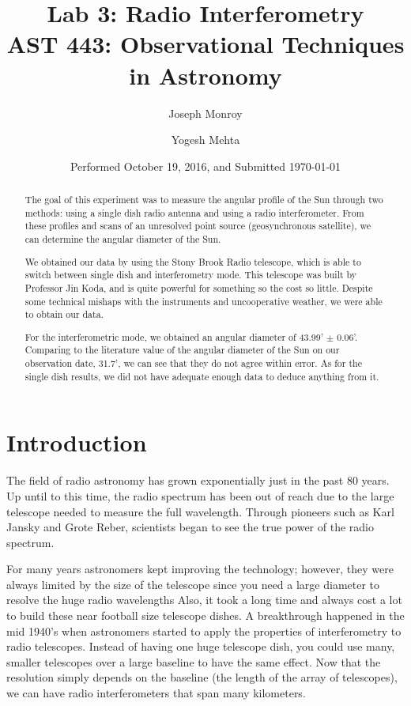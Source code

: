 \documentclass{aastex61}
\begin{document}
\title{Lab 3: Radio Interferometry \\ AST 443: Observational Techniques in Astronomy}

\date{Performed October 19, 2016, and Submitted \today}

\author{Joseph Monroy}

\author{Yogesh Mehta}


\begin{abstract}
The goal of this experiment was to measure the angular profile of the Sun through two methods: using a single dish radio antenna and using a radio interferometer. From these profiles and scans of an unresolved point source (geosynchronous satellite), we can determine the angular diameter of the Sun.

We obtained our data by using the Stony Brook Radio telescope, which is able to switch between single dish and interferometry mode. This telescope was built by Professor Jin Koda, and is quite powerful for something so the cost so little. Despite some technical mishaps with the instruments and uncooperative weather, we were able to obtain our data. 

For the interferometric mode, we obtained an angular diameter of 43.99' $\pm$ 0.06'. Comparing to the literature value of the angular diameter of the Sun on our observation date, 31.7', we can see that they do not agree within error. As for the single dish results, we did not have adequate enough data to deduce anything from it. 
\end{abstract}

\section{Introduction} \label{sec:intro}
The field of radio astronomy has grown exponentially just in the past 80 years. Up until to this time, the radio spectrum has been out of reach due to the large telescope needed to measure the full wavelength. Through pioneers such as Karl Jansky and Grote Reber, scientists began to see the true power of the radio spectrum. 

For many years astronomers kept improving the technology; however, they were always limited by the size of the telescope since you need a large diameter to resolve the huge radio wavelengths Also, it took a long time and always cost a lot to build these near football size telescope dishes. A breakthrough happened in the mid 1940's when astronomers started to apply the properties of interferometry to radio telescopes. Instead of having one huge telescope dish, you could use many, smaller telescopes over a large baseline to have the same effect. Now that the resolution simply depends on the baseline (the length of the array of telescopes), we can have radio interferometers that span many kilometers.
\end{document}
